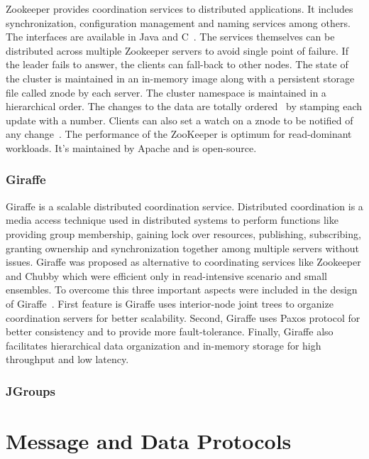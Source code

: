 {Zookeeper provides coordination services to distributed applications.
It includes synchronization, configuration management and naming
services among others. The interfaces are available in Java and
C~\cite{www-zoo-overiew}. The services themselves can be distributed
across multiple Zookeeper servers to avoid single point of failure.
If the leader fails to answer, the clients can fall-back to other
nodes. The state of the cluster is maintained in an in-memory image
along with a persistent storage file called znode by each server. The
cluster namespace is maintained in a hierarchical order. The changes
to the data are totally ordered~\cite{www-zoo-wiki} by stamping each
update with a number. Clients can also set a watch on a znode to be
notified of any change~\cite{www-zoo-ibm}. The performance of the
ZooKeeper is optimum for read-dominant workloads. It's maintained by
Apache and is open-source.

\subsubsection{Giraffe}

Giraffe is a scalable distributed coordination service. Distributed
coordination is a media access technique used in distributed systems
to perform functions like providing group membership, gaining lock
over resources, publishing, subscribing, granting ownership and
synchronization together among multiple servers without
issues. Giraffe was proposed as alternative to coordinating services
like Zookeeper and Chubby which were efficient only in read-intensive
scenario and small ensembles. To overcome this three important aspects
were included in the design of Giraffe~\cite{giraffePaper}. First
feature is Giraffe uses interior-node joint trees to organize
coordination servers for better scalability. Second, Giraffe uses
Paxos protocol for better consistency and to provide more
fault-tolerance. Finally, Giraffe also facilitates hierarchical data
organization and in-memory storage for high throughput and low
latency.
     
\subsubsection{JGroups}

\section{Message and Data Protocols}
\label{S:o-protocols}

}
